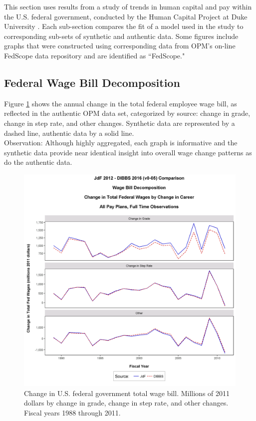 \documentclass[10pt, letterpaper]{article}
\begin{document}
\begin{spacing}{1.0}
This section uses results from a study of trends in human capital and pay within the U.S. federal government, conducted by the Human Capital Project at Duke University \citep{BoltondeFigGradeInflation2016}.  Each sub-section compares the fit of a model used in the study to corresponding sub-sets of synthetic and authentic data.  Some figures include graphs that were constructed using corresponding data from OPM's on-line FedScope data repository  \citep{OPMFedScope} and are identified as ``FedScope."

\subsection{Federal Wage Bill Decomposition}

Figure \ref{figure:WageChangePromotionVsFYAllPayPlans} shows the annual change in the total federal employee wage bill, as reflected in the authentic OPM data set, categorized by source:  change in grade, change in step rate, and other changes.  Synthetic data are represented by a dashed line, authentic data by a solid line.\\

Observation:  Although highly aggregated, each graph is informative and the synthetic data provide near identical insight into overall wage change patterns as do the authentic data.\\

\vspace{20pt}

\begin{figure}[h]
    \centering
    \includegraphics[width=6in, trim={0 0.6in 0 1.5in}, clip]{WageChangePromotionVsFYAllPayPlans.png}
    \caption{Change in U.S. federal government total wage bill.  Millions of 2011 dollars by change in grade, change in step rate, and other changes.  Fiscal years 1988 through 2011. }
    \label{figure:WageChangePromotionVsFYAllPayPlans}
\end{figure}


\end{spacing}
\end{document}
